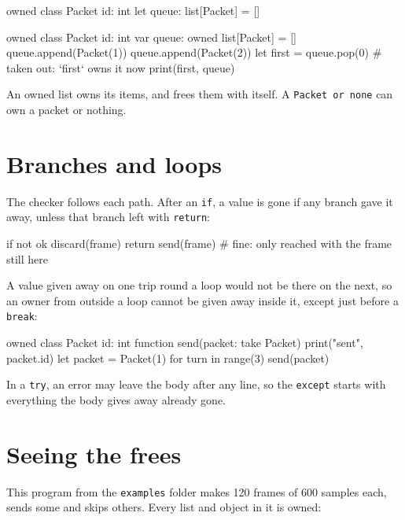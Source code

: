 \begin{zeno}[fails=yes]
owned class Packet {
    id: int
}
let queue: list[Packet] = []
\end{zeno}

\begin{zeno}
owned class Packet {
    id: int
}
var queue: owned list[Packet] = []
queue.append(Packet(1))
queue.append(Packet(2))
let first = queue.pop(0)          # taken out: `first` owns it now
print(first, queue)
\end{zeno}

An owned list owns its items, and frees them with itself. A
\verb|Packet or none| can own a packet or nothing.

\section{Branches and loops}

The checker follows each path. After an \verb|if|, a value is gone if
any branch gave it away, unless that branch left with \verb|return|:

\begin{zenofrag}
if not ok {
    discard(frame)
    return
}
send(frame)          # fine: only reached with the frame still here
\end{zenofrag}

A value given away on one trip round a loop would not be there on the
next, so an owner from outside a loop cannot be given away inside it,
except just before a \verb|break|:

\begin{zeno}[fails=yes]
owned class Packet {
    id: int
}
function send(packet: take Packet) {
    print("sent", packet.id)
}
let packet = Packet(1)
for turn in range(3) {
    send(packet)
}
\end{zeno}

In a \verb|try|, an error may leave the body after any line, so the
\verb|except| starts with everything the body gives away already gone.

\section{Seeing the frees}

This program from the \verb|examples| folder makes 120 frames of 600
samples each, sends some and skips others. Every list and object in it
is owned:

\begin{zeno}[src=examples/buffer.zeno, cmd=zeno build --memory buffer.zeno > /dev/null ;; ./buffer, file=buffer.zeno]
\end{zeno}

